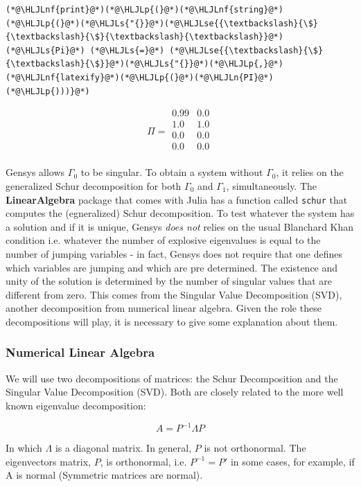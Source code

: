 \documentclass[12pt,a4paper]{article}
\newcommand{\HLJLn}[1]{#1}
\newcommand{\HLJLnf}[1]{\textcolor[RGB]{66,102,213}{#1}}
\newcommand{\HLJLs}[1]{\textcolor[RGB]{201,61,57}{#1}}
\newcommand{\HLJLse}[1]{\textcolor[RGB]{59,151,46}{#1}}
\newcommand{\HLJLp}[1]{#1}
\begin{document}
\begin{lstlisting}
(*@\HLJLnf{print}@*)(*@\HLJLp{(}@*)(*@\HLJLnf{string}@*)(*@\HLJLp{(}@*)(*@\HLJLs{"{}}@*)(*@\HLJLse{{\textbackslash}{\$}{\textbackslash}{\$}{\textbackslash}{\textbackslash}}@*)(*@\HLJLs{Pi}@*) (*@\HLJLs{=}@*) (*@\HLJLse{{\textbackslash}{\$}{\textbackslash}{\$}}@*)(*@\HLJLs{"{}}@*)(*@\HLJLp{,}@*)(*@\HLJLnf{latexify}@*)(*@\HLJLp{(}@*)(*@\HLJLn{PI}@*)(*@\HLJLp{)))}@*)
\end{lstlisting}

\begin{equation}
\Pi = 
\begin{array}{cc}
0.99 & 0.0 \\
1.0 & 1.0 \\
0.0 & 0.0 \\
0.0 & 0.0 \\
\end{array}
\end{equation}


Gensys allows $\Gamma_0$ to be singular. To obtain a system without $\Gamma_0$, it relies on the generalized Schur decomposition for both $\Gamma_0$ and $\Gamma_1$, simultaneously. The \textbf{LinearAlgebra} package that comes with Julia has a function called \texttt{schur} that computes the (egneralized) Schur decomposition. To test whatever the system has a solution and if it is unique, Gensys \emph{does not} relies on the usual Blanchard Khan condition i.e. whatever the number of explosive eigenvalues is equal to the number of jumping variables - in fact, Gensys does not require that one defines which variables are jumping and which are pre determined. The existence and unity of the solution is determined by the number of singular values that are different from zero. This comes from the Singular Value Decomposition (SVD), another decomposition from numerical linear algebra. Given the role these decompositions will play, it is necessary to give some explanation about them.

\subsubsection{Numerical Linear Algebra}
We will use two decompositions of matrices: the Schur Decomposition and the Singular Value Decomposition (SVD). Both are closely related to the more well known eigenvalue decomposition:

\[
A = P^{-1}\Lambda P
\]

In which $\Lambda$ is a diagonal matrix. In general, $P$ is not orthonormal. The eigenvectors matrix, $P$, is orthonormal, i.e. $P^{-1} = P'$ in some cases, for example, if A is normal (Symmetric matrices are normal).
\end{document}
